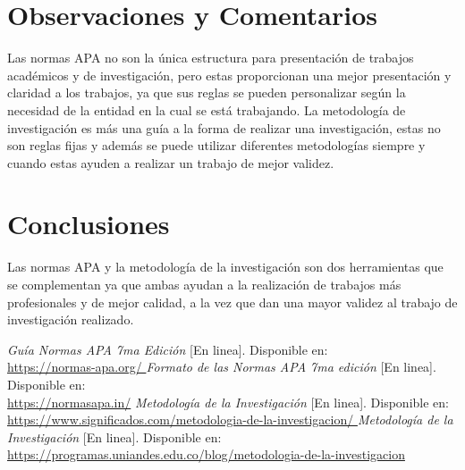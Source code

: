 \documentclass[12pt]{article}
\begin{document}
\section*{Observaciones y Comentarios}
Las normas APA no son la única estructura para presentación de trabajos académicos y de investigación, pero estas proporcionan una mejor presentación y claridad a los trabajos, ya que sus reglas se pueden personalizar según la necesidad de la entidad en la cual se está trabajando.
La metodología de investigación es más una guía a la forma de realizar una investigación, estas no son reglas fijas y además se puede utilizar diferentes metodologías siempre y cuando estas ayuden a realizar un trabajo de mejor validez.


\section*{Conclusiones}
Las normas APA y la metodología de la investigación son dos herramientas que se complementan ya que ambas ayudan a la realización de trabajos más profesionales y de mejor calidad, a la vez que dan una mayor validez al trabajo de investigación realizado.

\begin{thebibliography}{9}

\textit{Guía Normas APA 7ma Edición} [En linea]. Disponible en:\\ \url{https://normas-apa.org/ }
\textit{Formato de las Normas APA 7ma edición} [En linea]. Disponible en:\\ \url{https://normasapa.in/}
\textit{Metodología de la Investigación} [En linea]. Disponible en:\\ \url{https://www.significados.com/metodologia-de-la-investigacion/ }
\textit{Metodología de la Investigación} [En linea]. Disponible en:\\ \url{https://programas.uniandes.edu.co/blog/metodologia-de-la-investigacion }
\end{thebibliography}
\end{document}
